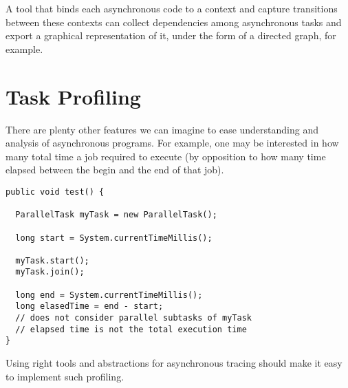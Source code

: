 A tool that binds each asynchronous code to a context and capture transitions between these contexts can collect dependencies among asynchronous tasks and export a graphical representation of it, under the form of a directed graph, for example.

\section{Task Profiling}

There are plenty other features we can imagine to ease understanding and analysis of asynchronous programs. For example, one may be interested in how many total time a job required to execute (by opposition to how many time elapsed between the begin and the end of that job).

\begin{lstlisting}
public void test() {
  
  ParallelTask myTask = new ParallelTask();

  long start = System.currentTimeMillis();

  myTask.start();
  myTask.join();

  long end = System.currentTimeMillis();
  long elasedTime = end - start;
  // does not consider parallel subtasks of myTask
  // elapsed time is not the total execution time
}
\end{lstlisting}

Using right tools and abstractions for asynchronous tracing should make it easy to implement such profiling.

